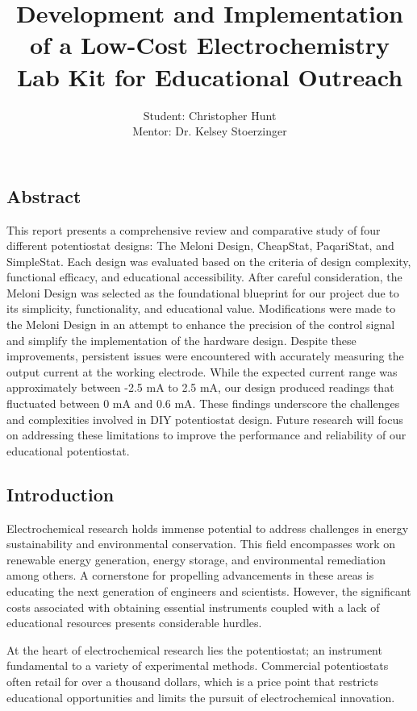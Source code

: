 \documentclass{article}
\title{\textcolor{mycolor}{\textbf{{\huge Development and Implementation of a Low-Cost Electrochemistry Lab Kit for Educational Outreach}}}}
\author{Student: Christopher Hunt \\ Mentor: Dr. Kelsey Stoerzinger}
\date{}
\begin{document}
\pagestyle{fancy}
\fancyhf{}
\rfoot{}
\rhead{\thepage}
\maketitle


\subsection*{Abstract}


This report presents a comprehensive review and comparative study of four different potentiostat designs: The Meloni Design, CheapStat, PaqariStat, and SimpleStat. Each design was evaluated based on the criteria of design complexity, functional efficacy, and educational accessibility. After careful consideration, the Meloni Design was selected as the foundational blueprint for our project due to its simplicity, functionality, and educational value. Modifications were made to the Meloni Design in an attempt to enhance the precision of the control signal and simplify the implementation of the hardware design. Despite these improvements, persistent issues were encountered with accurately measuring the output current at the working electrode. While the expected current range was approximately between -2.5 mA to 2.5 mA, our design produced readings that fluctuated between 0 mA and 0.6 mA. These findings underscore the challenges and complexities involved in DIY potentiostat design. Future research will focus on addressing these limitations to improve the performance and reliability of our educational potentiostat.


\subsection*{Introduction}
Electrochemical research holds immense potential to address challenges in energy sustainability and environmental conservation. This field encompasses work on renewable energy generation, energy storage, and environmental remediation among others. A cornerstone for propelling advancements in these areas is educating the next generation of engineers and scientists. However, the significant costs associated with obtaining essential instruments coupled with a lack of educational resources presents considerable hurdles.


At the heart of electrochemical research lies the potentiostat; an instrument fundamental to a variety of experimental methods. Commercial potentiostats often retail for over a thousand dollars, which is a price point that restricts educational opportunities and limits the pursuit of electrochemical innovation.
\end{document}
